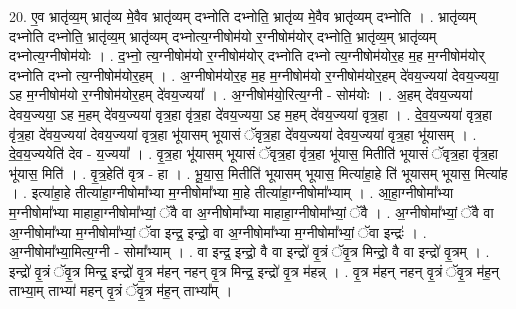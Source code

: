\documentclass[17pt]{extarticle}
\begin{document}
20. ए॒व भ्रातृ॑व्य॒म् भ्रातृ॑व्य मे॒वैव भ्रातृ॑व्यम् दभ्नोति दभ्नोति॒ भ्रातृ॑व्य मे॒वैव भ्रातृ॑व्यम् दभ्नोति । . भ्रातृ॑व्यम् दभ्नोति दभ्नोति॒ भ्रातृ॑व्य॒म् भ्रातृ॑व्यम् दभ्नोत्य॒ग्नीषोम॑यो र॒ग्नीषोम॑योर् दभ्नोति॒ भ्रातृ॑व्य॒म् भ्रातृ॑व्यम् दभ्नोत्य॒ग्नीषोम॑योः । . द॒भ्नो॒ त्य॒ग्नीषोम॑यो र॒ग्नीषोम॑योर् दभ्नोति दभ्नो त्य॒ग्नीषोम॑योर॒ह म॒ह म॒ग्नीषोम॑योर् दभ्नोति दभ्नो त्य॒ग्नीषोम॑योर॒हम् । . अ॒ग्नीषोम॑योर॒ह म॒ह म॒ग्नीषोम॑यो र॒ग्नीषोम॑योर॒हम् दे॑वय॒ज्यया॑ देवय॒ज्यया॒ ऽह म॒ग्नीषोम॑यो र॒ग्नीषोम॑योर॒हम् दे॑वय॒ज्यया᳚ । . अ॒ग्नीषोम॑यो॒रित्य॒ग्नी - सोम॑योः । . अ॒हम् दे॑वय॒ज्यया॑ देवय॒ज्यया॒ ऽह म॒हम् दे॑वय॒ज्यया॑ वृत्र॒हा वृ॑त्र॒हा दे॑वय॒ज्यया॒ ऽह म॒हम् दे॑वय॒ज्यया॑ वृत्र॒हा । . दे॒व॒य॒ज्यया॑ वृत्र॒हा वृ॑त्र॒हा दे॑वय॒ज्यया॑ देवय॒ज्यया॑ वृत्र॒हा भू॑यासम् भूयासं ॅवृत्र॒हा दे॑वय॒ज्यया॑ देवय॒ज्यया॑ वृत्र॒हा भू॑यासम् । . दे॒व॒य॒ज्ययेति॑ देव - य॒ज्यया᳚ । . वृ॒त्र॒हा भू॑यासम् भूयासं ॅवृत्र॒हा वृ॑त्र॒हा भू॑यास॒ मितीति॑ भूयासं ॅवृत्र॒हा वृ॑त्र॒हा भू॑यास॒ मिति॑ । . वृ॒त्र॒हेति॑ वृत्र - हा । . भू॒या॒स॒ मितीति॑ भूयासम् भूयास॒ मित्या॑हा॒हे ति॑ भूयासम् भूयास॒ मित्या॑ह । . इत्या॑हा॒हे तीत्या॑हा॒ग्नीषोमा᳚भ्या म॒ग्नीषोमा᳚भ्या मा॒हे तीत्या॑हा॒ग्नीषोमा᳚भ्याम् । . आ॒हा॒ग्नीषोमा᳚भ्या म॒ग्नीषोमा᳚भ्या माहाहा॒ग्नीषोमा᳚भ्यां॒ ॅवै वा अ॒ग्नीषोमा᳚भ्या माहाहा॒ग्नीषोमा᳚भ्यां॒ ॅवै । . अ॒ग्नीषोमा᳚भ्यां॒ ॅवै वा अ॒ग्नीषोमा᳚भ्या म॒ग्नीषोमा᳚भ्यां॒ ॅवा इन्द्र॒ इन्द्रो॒ वा अ॒ग्नीषोमा᳚भ्या म॒ग्नीषोमा᳚भ्यां॒ ॅवा इन्द्रः॑ । . अ॒ग्नीषोमा᳚भ्या॒मित्य॒ग्नी - सोमा᳚भ्याम् । . वा इन्द्र॒ इन्द्रो॒ वै वा इन्द्रो॑ वृ॒त्रं ॅवृ॒त्र मिन्द्रो॒ वै वा इन्द्रो॑ वृ॒त्रम् । . इन्द्रो॑ वृ॒त्रं ॅवृ॒त्र मिन्द्र॒ इन्द्रो॑ वृ॒त्र म॑हन् नहन् वृ॒त्र मिन्द्र॒ इन्द्रो॑ वृ॒त्र म॑हन्न् । . वृ॒त्र म॑हन् नहन् वृ॒त्रं ॅवृ॒त्र म॑ह॒न् ताभ्या॒म् ताभ्या॑ महन् वृ॒त्रं ॅवृ॒त्र म॑ह॒न् ताभ्या᳚म् । \newline
\end{document}
